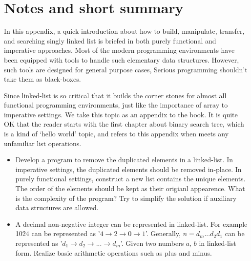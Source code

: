 \documentclass[UTF8]{article}
\begin{document}
\section{Notes and short summary}
In this appendix, a quick introduction about how to build, manipulate, transfer, and searching singly
linked list is briefed in both purely functional and imperative approaches. Most of the modern programming
environments have been equipped with tools to handle such elementary data structures. However, such tools
are designed for general purpose cases, Serious programming shouldn't take them as black-boxes.

Since linked-list is so critical that it builds the corner stones for almost all functional programming
environments, just like the importance of array to imperative settings. We take this topic as an appendix
to the book. It is quite OK that the reader starts with the first chapter about binary search tree, which
is a kind of `hello world' topic, and refers to this appendix when meets any unfamiliar list operations.

\begin{Exercise}
\begin{itemize}
\item Develop a program to remove the duplicated elements in a linked-list.
In imperative settings, the duplicated elements should be removed in-place. In purely functional
settings, construct a new list contains the unique elements. The order of the elements
should be kept as their origianl appearence. What is the complexity of the
program? Try to simplify the solution if auxiliary data structures are allowed.
\item A decimal non-negative integer can be represented in linked-list. For example 1024 can be represented as
'$4 \rightarrow 2 \rightarrow 0 \rightarrow 1$'. Generally, $n = d_m...d_2d_1$ can be represented as
'$d_1 \rightarrow d_2 \rightarrow ... \rightarrow d_m$'. Given two numbers $a$, $b$ in linked-list form.
Realize basic arithmetic operations such as plus and minus.
\end{itemize}
\end{Exercise}

\end{document}
